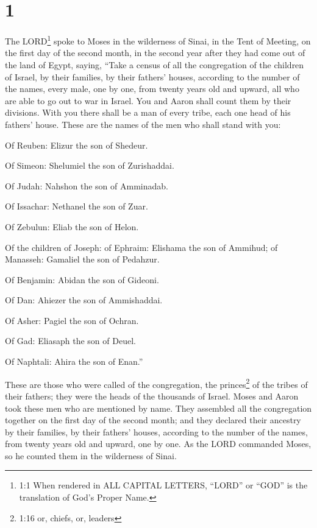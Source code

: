 \hypertarget{section}{%
\section{1}\label{section}}

 The LORD\footnote{1:1 When rendered in ALL CAPITAL LETTERS,
  ``LORD'' or ``GOD'' is the translation of God's Proper Name.} spoke to
Moses in the wilderness of Sinai, in the Tent of Meeting, on the first
day of the second month, in the second year after they had come out of
the land of Egypt, saying,  ``Take a census of all the
congregation of the children of Israel, by their families, by their
fathers' houses, according to the number of the names, every male, one
by one,  from twenty years old and upward, all who are able
to go out to war in Israel. You and Aaron shall count them by their
divisions.  With you there shall be a man of every tribe,
each one head of his fathers' house.  These are the names of
the men who shall stand with you:

Of Reuben: Elizur the son of Shedeur.

 Of Simeon: Shelumiel the son of Zurishaddai.

 Of Judah: Nahshon the son of Amminadab.

 Of Issachar: Nethanel the son of Zuar.

 Of Zebulun: Eliab the son of Helon.

 Of the children of Joseph: of Ephraim: Elishama the son of
Ammihud; of Manasseh: Gamaliel the son of Pedahzur.

 Of Benjamin: Abidan the son of Gideoni.

 Of Dan: Ahiezer the son of Ammishaddai.

 Of Asher: Pagiel the son of Ochran.

 Of Gad: Eliasaph the son of Deuel.

 Of Naphtali: Ahira the son of Enan.''

 These are those who were called of the congregation, the
princes\footnote{1:16 or, chiefs, or, leaders} of the tribes of their
fathers; they were the heads of the thousands of Israel. 
Moses and Aaron took these men who are mentioned by name. 
They assembled all the congregation together on the first day of the
second month; and they declared their ancestry by their families, by
their fathers' houses, according to the number of the names, from twenty
years old and upward, one by one.  As the LORD commanded
Moses, so he counted them in the wilderness of Sinai.

